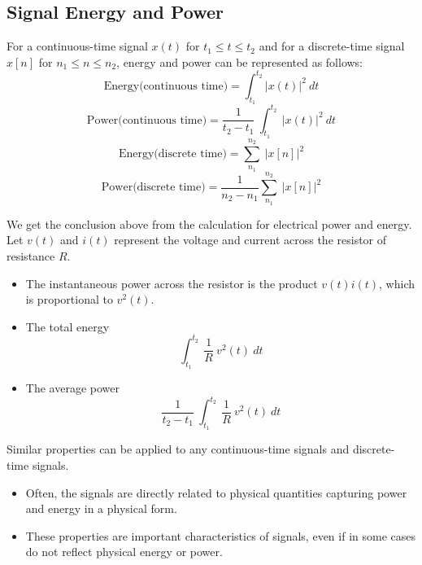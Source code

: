 \subsection{Signal Energy and Power}
For a continuous-time signal $x(t)$ for $t_1 \leq t \leq t_2$ and for a discrete-time signal $x[n]$ for $n_1 \leq n \leq n_2$, energy and power can be represented as follows:
\[ \text{Energy(continuous time)} = \int_{t_1}^{t_2} \lvert x(t) \rvert^2 \ dt \]
\[ \text{Power(continuous  time)} = \frac{1}{t_2 - t_1} \ \int_{t_1}^{t_2} \ \lvert x(t) \rvert^2 \ dt \]
\[ \text{Energy(discrete time)} = \sum_{n_1}^{n_2} \ \lvert x[n] \rvert ^2 \]
\[ \text{Power(discrete time)} = \frac{1}{n_2 - n_1} \sum_{n_1}^{n_2} \ \lvert x[n] \rvert ^2 \]

\begin{tcolorbox}[title= Electrical circuit analogy, breakable]
  We get the conclusion above from the calculation for electrical power and energy.
  Let $v(t)$ and $i(t)$ represent the voltage and current across the resistor of resistance $R$. 
 \begin{itemize}
  \item The instantaneous power across the resistor is the product $v(t)i(t)$, which is proportional to $v^2(t)$.
  \item The total energy \[ \int_{t_1}^{t_2} \ \frac{1}{R} \ v^2(t) \ dt \] 
  \item The average power \[ \frac{1}{t_2 - t_1} \ \int_{t_1}^{t_2} \ \frac{1}{R} \ v^2(t) \ dt \]
  \end{itemize}
  Similar properties can be applied to any continuous-time signals and discrete-time signals.
\end{tcolorbox}
  
\begin{itemize}
 \item Often, the signals are directly related to physical quantities capturing power and energy in a physical form.
 \item These properties are important characteristics of signals, even if in some cases do not reflect physical energy or power.
\end{itemize}

